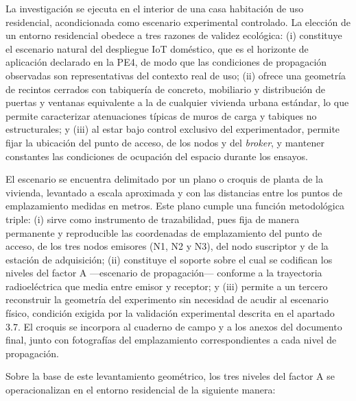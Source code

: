 \documentclass[
  12pt,
]{article}
\begin{document}
La investigación se ejecuta en el interior de una casa habitación de uso
residencial, acondicionada como escenario experimental controlado. La
elección de un entorno residencial obedece a tres razones de validez
ecológica: (i) constituye el escenario natural del despliegue IoT
doméstico, que es el horizonte de aplicación declarado en la PE4, de
modo que las condiciones de propagación observadas son representativas
del contexto real de uso; (ii) ofrece una geometría de recintos cerrados
con tabiquería de concreto, mobiliario y distribución de puertas y
ventanas equivalente a la de cualquier vivienda urbana estándar, lo que
permite caracterizar atenuaciones típicas de muros de carga y tabiques
no estructurales; y (iii) al estar bajo control exclusivo del
experimentador, permite fijar la ubicación del punto de acceso, de los
nodos y del \emph{broker}, y mantener constantes las condiciones de
ocupación del espacio durante los ensayos.

El escenario se encuentra delimitado por un plano o croquis de planta de
la vivienda, levantado a escala aproximada y con las distancias entre
los puntos de emplazamiento medidas en metros. Este plano cumple una
función metodológica triple: (i) sirve como instrumento de trazabilidad,
pues fija de manera permanente y reproducible las coordenadas de
emplazamiento del punto de acceso, de los tres nodos emisores (N1, N2 y
N3), del nodo suscriptor y de la estación de adquisición; (ii)
constituye el soporte sobre el cual se codifican los niveles del factor
A —escenario de propagación— conforme a la trayectoria radioeléctrica
que media entre emisor y receptor; y (iii) permite a un tercero
reconstruir la geometría del experimento sin necesidad de acudir al
escenario físico, condición exigida por la validación experimental
descrita en el apartado 3.7. El croquis se incorpora al cuaderno de
campo y a los anexos del documento final, junto con fotografías del
emplazamiento correspondientes a cada nivel de propagación.

Sobre la base de este levantamiento geométrico, los tres niveles del
factor A se operacionalizan en el entorno residencial de la siguiente
manera:
\end{document}
